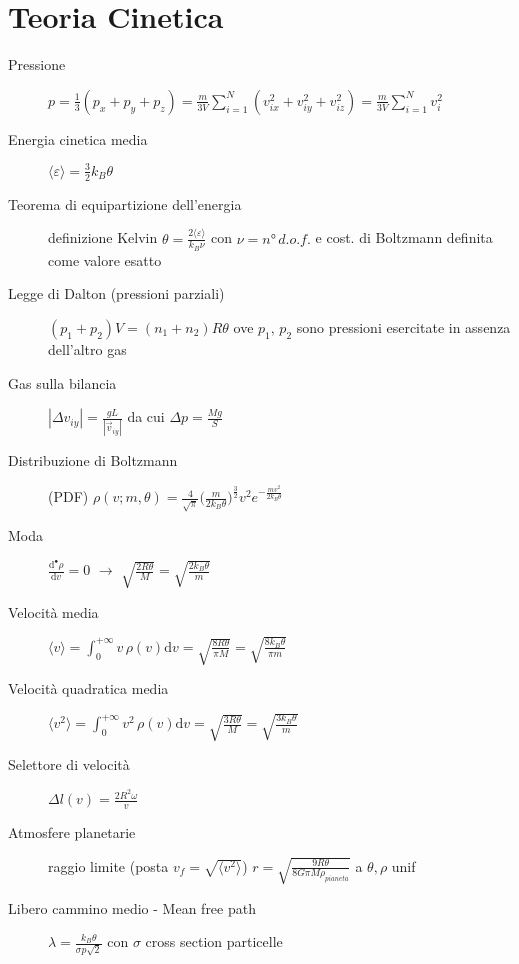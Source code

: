\documentclass[10pt, oneside]{article}
\begin{document}
\section{Teoria Cinetica}
\begin{description}
\item[Pressione] $\displaystyle p = \frac{1}{3} (p_x + p_y + p_z) = \frac{m}{3V} \sum\limits_{i=1}^N (v_{ix}^2 + v_{iy}^2 + v_{iz}^2) = \frac{m}{3V} \sum\limits_{i=1}^N v_i^2$
\item[Energia cinetica media] $\boxed{\displaystyle \langle \varepsilon \rangle = \frac{3}{2} k_B \theta}$
\item[Teorema di equipartizione dell'energia] definizione Kelvin $\displaystyle \theta = \frac{2 \langle \varepsilon \rangle }{k_B \nu}$ con $\nu  = n° \, d.o.f.$ e cost. di Boltzmann definita come valore esatto
\item[Legge di Dalton (pressioni parziali)] $\displaystyle (p_1 + p_2) V = (n_1 + n_2) R \theta$ ove $p_1, \, p_2$ sono pressioni esercitate in assenza dell'altro gas
\item[Gas sulla bilancia] $\displaystyle |\Delta v_{iy}| = \frac{gL}{|\vec{v}_{iy}|}$ da cui $\displaystyle \Delta p = \frac{Mg}{S}$
\item[Distribuzione di Boltzmann] (PDF) $\boxed{\displaystyle \rho (v; m, \theta) = \frac{4}{\sqrt{\pi}} \big(\frac{m}{2k_B \theta}\big)^{\frac{3}{2}} v^2 e^{\displaystyle - \frac{mv^2}{2k_B \theta}}}$
\item[Moda] $\displaystyle \frac{\mathrm{d}^{•} \rho}{\mathrm{d}v^{}} = 0$ $\rightarrow$ $\displaystyle \sqrt{\frac{2 R \theta}{M}} = \sqrt{\frac{2 k_B \theta}{m}}$
\item[Velocità media] $\displaystyle \langle v \rangle = \int_{0}^{+\infty}v \, \rho(v) \mathrm{d}v = \sqrt{\frac{8 R \theta}{\pi M}} = \sqrt{\frac{8 k_B \theta}{\pi m}}$
\item[Velocità quadratica media] $\displaystyle \langle v^2 \rangle = \int_{0}^{+\infty}v^2 \, \rho(v) \mathrm{d}v = \sqrt{\frac{3 R \theta}{M}} = \sqrt{\frac{3 k_B \theta}{m}}$
\item[Selettore di velocità] $\displaystyle \Delta l(v) = \frac{2 R^2 \omega}{v}$
\item[Atmosfere planetarie] raggio limite (posta $v_f = \sqrt{\langle v^2 \rangle}$) $\displaystyle r = \sqrt{\frac{9 R \theta}{8 G \pi M \rho_{pianeta}}}$ a $\theta, \rho$ unif
\item[Libero cammino medio - Mean free path] $\displaystyle \lambda = \frac{k_B \theta}{\sigma p \sqrt{2}}$ con $\sigma$ cross section particelle
\end{description}
\end{document}
